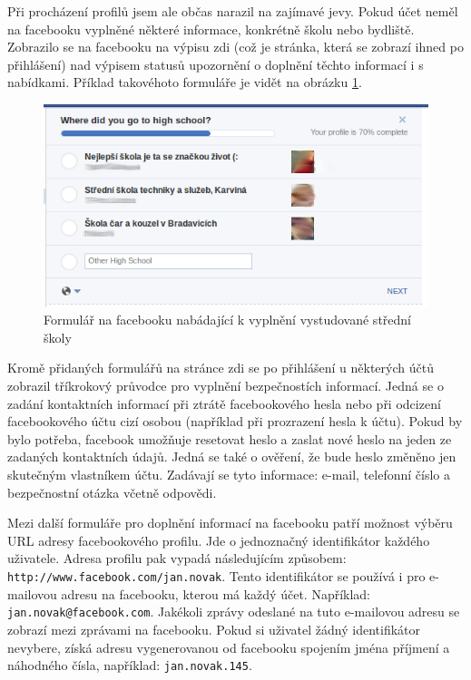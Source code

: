 \documentclass[thesis=M,czech]{FITthesis}[2013/05/10]
\begin{document}
Při procházení profilů jsem ale občas narazil na zajímavé jevy. Pokud účet neměl na facebooku vyplněné některé informace, konkrétně školu nebo bydliště. Zobrazilo se na facebooku na výpisu zdi (což je stránka, která se zobrazí ihned po přihlášení) nad výpisem statusů upozornění o doplnění těchto informací i s nabídkami. Příklad takovéhoto formuláře je vidět na obrázku \ref{fig:completeSchool}.

\begin{figure}[h]
\begin{center}
\includegraphics[width=5in]{figures/completeSchool.png}
\caption{Formulář na facebooku nabádající k vyplnění vystudované střední školy}
\label{fig:completeSchool}
\end{center}
\end{figure}

Kromě přidaných formulářů na stránce zdi se po přihlášení u některých účtů zobrazil tříkrokový průvodce pro vyplnění bezpečnostích informací. Jedná se o zadání kontaktních informací při ztrátě facebookového hesla nebo při odcizení facebookového účtu cizí osobou (například při prozrazení hesla k účtu). Pokud by bylo potřeba, facebook umožňuje resetovat heslo a zaslat nové heslo na jeden ze zadaných kontaktních údajů. Jedná se také o ověření, že bude heslo změněno jen skutečným vlastníkem účtu. Zadávají se tyto informace: e-mail, telefonní číslo a bezpečnostní otázka včetně odpovědi. 

Mezi další formuláře pro doplnění informací na facebooku patří možnost výběru URL adresy facebookového profilu. Jde o jednoznačný identifikátor každého uživatele. Adresa profilu pak vypadá následujícím způsobem: \verb|http://www.facebook.com/jan.novak|. Tento identifikátor se používá i pro e-mailovou adresu na facebooku, kterou má každý účet. Například: \verb|jan.novak@facebook.com|. Jakékoli zprávy odeslané na tuto e-mailovou adresu se zobrazí mezi zprávami na facebooku. Pokud si uživatel žádný identifikátor nevybere, získá adresu vygenerovanou od facebooku spojením jména příjmení a náhodného čísla, například: \verb|jan.novak.145|.
\end{document}
